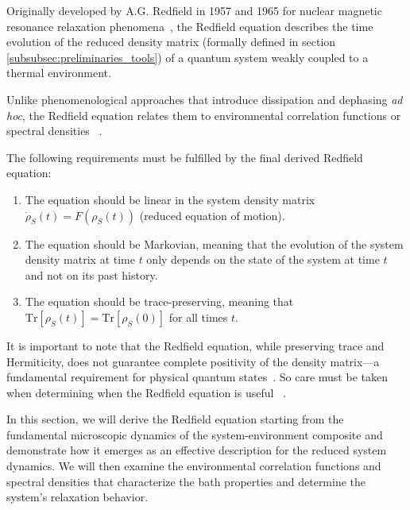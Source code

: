 Originally developed by A.G. Redfield in 1957 and 1965 for nuclear magnetic resonance relaxation phenomena~\cite{redfield1965theoryrelaxationprocesses}, the Redfield equation describes the time evolution of the reduced density matrix (formally defined in section \ref{subsubsec:preliminaries_tools}) of a quantum system weakly coupled to a thermal environment.

\noindent
Unlike phenomenological approaches that introduce dissipation and dephasing \emph{ad hoc}, the Redfield equation relates them to environmental correlation functions or spectral densities ~\cite{breuerpetruccione2009theoryopenquantum, weiss2012quantumdissipativesystems}.

\noindent
The following requirements must be fulfilled by the final derived Redfield equation:

\begin{enumerate}
	\item The equation should be linear in the system density matrix $\dot{\rho}_S(t) = F(\rho_S(t))$ (reduced equation of motion).
	\item The equation should be Markovian, meaning that the evolution of the system density matrix  at time $t$ only depends on the state of the system at time $t$ and not on its past history.
	\item The equation should be trace-preserving, meaning that $\mathrm{Tr}[\rho_S(t)] = \mathrm{Tr}[\rho_S(0)]$ for all times $t$.
\end{enumerate}

It is important to note that the Redfield equation, while preserving trace and Hermiticity, does not guarantee complete positivity of the density matrix—a fundamental requirement for physical quantum states~\cite{rivasetal2010markovianmasterequations}. 
So care must be taken when determining when the Redfield equation is useful ~\cite{redfield1965theoryrelaxationprocesses, rivasetal2014quantumnonmarkovianitycharacterization, lietal2018conceptsquantumnonmarkovianity}.


\noindent
In this section, we will derive the Redfield equation starting from the fundamental microscopic dynamics of the system-environment composite and demonstrate how it emerges as an effective description for the reduced system dynamics. We will then examine the environmental correlation functions and spectral densities that characterize the bath properties and determine the system's relaxation behavior.

